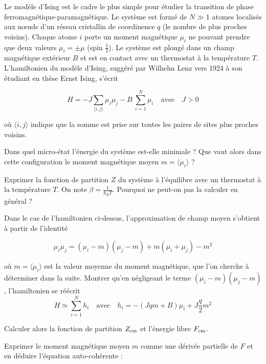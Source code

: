 Le modèle d'Ising est le cadre le plus simple pour étudier la transition de phase ferromagnétique-paramagnétique. Le système est formé de $N \gg 1$ atomes localisés aux n\oe uds d'un réseau cristallin de coordinence $q$ (le nombre de plus proches voisins). Chaque atome $i$ porte un moment magnétique $\mu_i$ ne pouvant prendre que deux valeurs $\mu_i= \pm \mu$ (spin $\frac{1}{2}$). Le système est plongé dans un champ magnétique extérieur $B$ et est en contact avec un thermostat à la température $T$. L'hamiltonien du modèle d'Ising, suggéré par Wilhelm Lenz vers 1924 à son étudiant en thèse Ernst Ising, s'écrit

\begin{equation}
H=-J\sum_{\langle i,j \rangle}\mu_i \mu_j -B\ \sum_{i=1}^N \mu_i \quad \textrm{avec} \quad J>0
\end{equation}

où ${\langle i,j\rangle}$ indique que la somme est prise sur toutes les paires de sites plus proches voisins.

\medskip

\question
Dans quel micro-état l'énergie du système est-elle minimale ? Que vaut alors dans cette configuration le moment magnétique moyen $m=\langle \mu_i \rangle$ ?

\question
Exprimer la fonction de partition $Z$ du système à l'équilibre avec un thermostat à la température $T$. On note $\beta=\frac{1}{k_B T}$. Pourquoi ne peut-on pas la calculer en général ?

\question
Dans le cas de l'hamiltonien ci-dessus, l'approximation de champ moyen s'obtient à partir de l'identité

\begin{equation}
\mu_i\mu_j = (\mu_i -m)(\mu_j -m)+ m(\mu_i+\mu_j)-m^2
\end{equation}

où $m=\langle \mu_i \rangle$ est la valeur moyenne du moment magnétique, que l'on cherche à déterminer dans la suite.  Montrer qu'en négligeant le terme $(\mu_i -m)(\mu_j -m)$, l'hamiltonien se réécrit 
$$
H \simeq \sum_{i=1}^N h_i \quad \textrm{avec} \quad h_i= -(Jqm+B) \mu_i
+J\frac{q}{2} m^2
$$

\question
Calculer alors la fonction de partition $Z_{\rm cm}$ et l'énergie libre $F_{\rm cm}$.

\question
Exprimer le moment magnétique moyen $m$ comme une dérivée partielle de $F$ et en déduire l'équation auto-cohérente :

